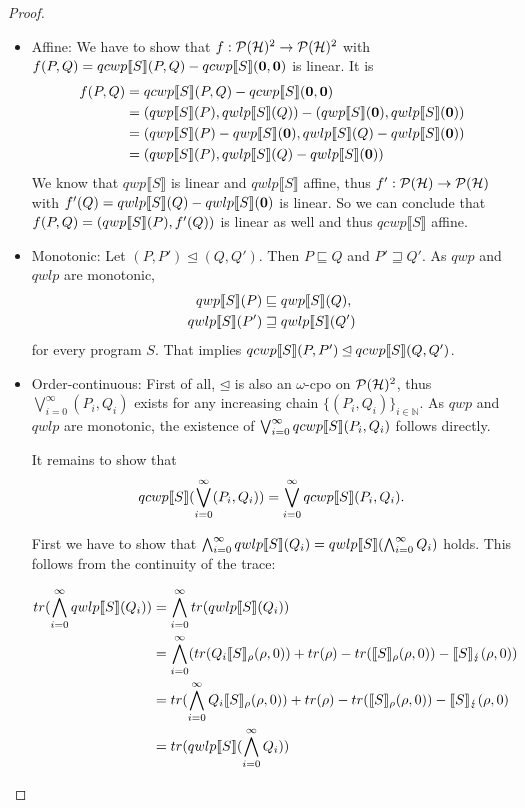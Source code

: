 \documentclass[a4paper,UKenglish,cleveref, autoref, thm-restate]{lipics-v2021}
\begin{document}
\begin{proof}
\begin{itemize}
        \item Affine: We have to show that $f:\mathcal{P}(\mathcal{H})^2 \to \mathcal{P}(\mathcal{H})^2$ with $f(P,Q)=qcwp\llbracket S \rrbracket (P,Q) - qcwp\llbracket S \rrbracket (\mathbf{0},\mathbf{0})$ is linear.
        It is \begin{align*}
            f(P,Q) &= qcwp\llbracket S \rrbracket (P,Q) - qcwp\llbracket S \rrbracket (\mathbf{0},\mathbf{0}) \\
            &= (qwp\llbracket S \rrbracket (P),qwlp\llbracket S \rrbracket (Q))-(qwp\llbracket S \rrbracket (\mathbf{0}),{qwlp\llbracket S \rrbracket (\mathbf{0})})\\
            &= (qwp\llbracket S \rrbracket (P)-qwp\llbracket S \rrbracket (\mathbf{0}),qwlp\llbracket S \rrbracket (Q)-qwlp\llbracket S \rrbracket (\mathbf{0}))\\
            &= (qwp\llbracket S \rrbracket (P),qwlp\llbracket S \rrbracket (Q)-qwlp\llbracket S \rrbracket (\mathbf{0}))
        \end{align*}
        We know that $qwp\llbracket S \rrbracket$ is linear and $qwlp\llbracket S \rrbracket$ affine, thus $f':\mathcal{P}(\mathcal{H}) \to \mathcal{P}(\mathcal{H})$ with $f'(Q)=qwlp\llbracket S \rrbracket (Q)-qwlp\llbracket S \rrbracket (\mathbf{0})$ is linear. So we can conclude that
        $f(P,Q)=(qwp\llbracket S \rrbracket (P), f'(Q))$ is linear as well and thus $qcwp\llbracket S \rrbracket $ affine.
\item Monotonic: Let $(P,P') \unlhd (Q,Q')$. Then $P \sqsubseteq Q$ and $P' \sqsupseteq Q'$. As $qwp$ and $qwlp$ are monotonic,
        \begin{align*}
            qwp\llbracket S \rrbracket (P) &\sqsubseteq qwp\llbracket S \rrbracket (Q),\\
            qwlp\llbracket S \rrbracket (P') &\sqsupseteq qwlp\llbracket S \rrbracket (Q')
        \end{align*}
        for every program $S$. That implies $
            qcwp\llbracket S \rrbracket (P,P') \unlhd qcwp\llbracket S \rrbracket (Q,Q')$.
        \item Order-continuous:
        First of all, $\unlhd$ is also an $\omega$-cpo on $\mathcal{P}(\mathcal{H})^2$, thus  $\bigvee_{i=0}^\infty (P_i,Q_i)$ exists for any increasing chain $\{(P_i,Q_i)\}_{i \in \mathbb{N}}$.
    As $qwp$ and $qwlp$ are monotonic, the existence of $\bigvee_{i=0}^\infty qcwp\llbracket S \rrbracket (P_i,Q_i)$ follows directly.

    It remains to show that
        \begin{align*}
            qcwp\llbracket S \rrbracket (\bigvee_{i=0}^\infty (P_i,Q_i)) = \bigvee_{i=0}^\infty qcwp\llbracket S \rrbracket (P_i,Q_i).
        \end{align*}

    First we have to show that $\bigwedge_{i=0}^\infty qwlp\llbracket S \rrbracket (Q_i) = qwlp\llbracket S \rrbracket (\bigwedge_{i=0}^\infty Q_i)$ holds. This follows from the continuity of the trace:

    \begin{align*}
        tr(\bigwedge_{i=0}^\infty qwlp\llbracket S \rrbracket (Q_i)) &=\bigwedge_{i=0}^\infty  tr(qwlp\llbracket S \rrbracket (Q_i))\\
        &= \bigwedge_{i=0}^\infty (tr(Q_i \llbracket S \rrbracket_{\rho}(\rho,0)) + tr(\rho) - tr(\llbracket S \rrbracket_{\rho}(\rho,0)) - \llbracket S \rrbracket_{\lightning}(\rho,0))\\
        &=  tr(\bigwedge_{i=0}^\infty Q_i \llbracket S \rrbracket_{\rho}(\rho,0)) + tr(\rho) - tr(\llbracket S \rrbracket_{\rho}(\rho,0)) - \llbracket S \rrbracket_{\lightning}(\rho,0)\\
        &= tr(qwlp\llbracket S \rrbracket (\bigwedge_{i=0}^\infty Q_i))
    \end{align*}


\end{itemize}
\end{proof}
\end{document}
